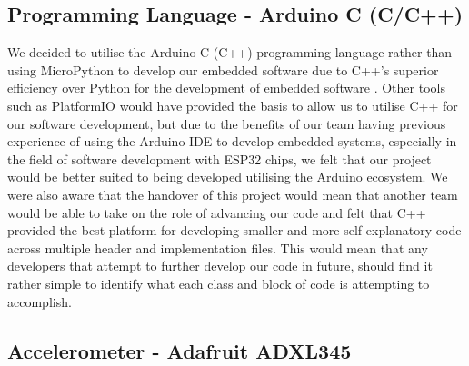                 \subsection{Programming Language - Arduino C (C/C++)}
                \label{subsec:programming_language}
        
                    We decided to utilise the Arduino C (C++) programming language rather than using MicroPython to develop our embedded software due to C++'s superior efficiency over Python for the development of embedded software \cite{github_2014, dicola}. Other tools such as PlatformIO would have provided the basis to allow us to utilise C++ for our software development, but due to the benefits of our team having previous experience of using the Arduino IDE to develop embedded systems, especially in the field of software development with ESP32 chips, we felt that our project would be better suited to being developed utilising the Arduino ecosystem. We were also aware that the handover of this project would mean that another team would be able to take on the role of advancing our code and felt that C++ provided the best platform for developing smaller and more self-explanatory code across multiple header and implementation files. This would mean that any developers that attempt to further develop our code in future, should find it rather simple to identify what each class and block of code is attempting to accomplish.
        
                \subsection{Accelerometer - Adafruit ADXL345}
                \label{subsec:accel}
        
